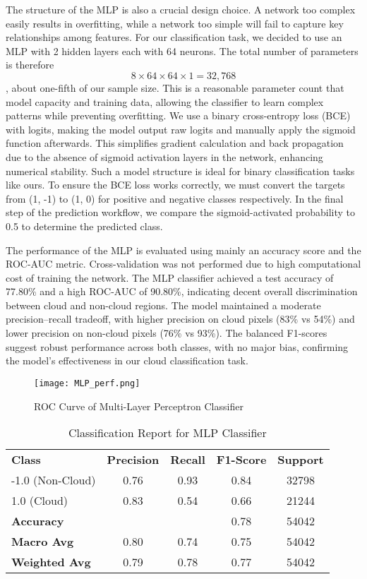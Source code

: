 \documentclass[10pt,letterpaper]{article}
\begin{document}
The structure of the MLP is also a crucial design choice. A network too complex easily results in overfitting, while a network too simple will fail to capture key relationships among features. For our classification task, we decided to use an MLP with 2 hidden layers each with 64 neurons. The total number of parameters is therefore \[ 8 \times 64 \times 64 \times 1 = 32,768\], about one-fifth of our sample size. This is a reasonable parameter count that model capacity and training data, allowing the classifier to learn complex patterns while preventing overfitting. We use a binary cross-entropy loss (BCE) with logits, making the model output raw logits and manually apply the sigmoid function afterwards. This simplifies gradient calculation and back propagation due to the absence of sigmoid activation layers in the network, enhancing numerical stability. Such a model structure is ideal for binary classification tasks like ours. To ensure the BCE loss works correctly, we must convert the targets from (1, -1) to (1, 0) for positive and negative classes respectively. In the final step of the prediction workflow, we compare the sigmoid-activated probability to 0.5 to determine the predicted class.

The performance of the MLP is evaluated using mainly an accuracy score and the ROC-AUC metric. Cross-validation was not performed due to high computational cost of training the network. The MLP classifier achieved a test accuracy of 77.80\% and a high ROC-AUC of 90.80\%, indicating decent overall discrimination between cloud and non-cloud regions. The model maintained a moderate precision–recall tradeoff, with higher precision on cloud pixels (83\% vs 54\%) and lower precision on non-cloud pixels (76\% vs 93\%). The balanced F1-scores suggest robust performance across both classes, with no major bias, confirming the model’s effectiveness in our cloud classification task.

\begin{figure}[H]
    \centering
    \texttt{[image: MLP\_perf.png]}
    \caption{ROC Curve of Multi-Layer Perceptron Classifier}
    \label{fig:enter-label}
\end{figure}

\begin{table}[H]
\centering
\caption{Classification Report for MLP Classifier}
\begin{tabular}{lcccc}
\textbf{Class} & \textbf{Precision} & \textbf{Recall} & \textbf{F1-Score} & \textbf{Support} \\
-1.0 (Non-Cloud) & 0.76 & 0.93 & 0.84 & 32798 \\
1.0 (Cloud)      & 0.83 & 0.54 & 0.66 & 21244 \\
\textbf{Accuracy} & & & 0.78 & 54042 \\
\textbf{Macro Avg} & 0.80 & 0.74 & 0.75 & 54042 \\
\textbf{Weighted Avg} & 0.79 & 0.78 & 0.77 & 54042 \\
\end{tabular}
\end{table}
\end{document}
